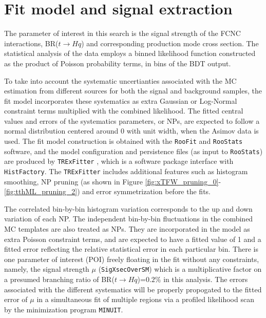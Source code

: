 \section{Fit model and signal extraction}
\label{sec:fit}

The parameter of interest in this search is the signal strength of the FCNC interactions, BR($t\to Hq$) and corresponding production mode cross section. The statistical analysis of the data employs a binned likelihood function constructed as the product of Poisson probability terms, in bins of the BDT output.

To take into account the systematic uncertianties associated with the MC estimation from different sources for both the signal and background samples, the fit model incorporates these systematics as extra Gaussian or Log-Normal constraint terms multiplied with the combined likelihood. The fitted central values and errors of the systematics parameters, or NPs, are expected to follow a normal distribution centered around 0 with unit width, when the Asimov data is used. The fit model construction is obtained with the \texttt{RooFit} and \texttt{RooStats} software, and the model configuration and persistence files (as input to \texttt{RooStats}) are produced by \texttt{TRExFitter} \cite{TRExFitter}, which is a software package interface with \texttt{HistFactory}. The \texttt{TRExFitter} includes additional features such as histogram smoothing, NP pruning (as shown in Figure \ref{fig:xTFW_pruning_0}-\ref{fig:tthML_pruning_2}) and error symmetrization before the fits.

The correlated bin-by-bin histogram variation corresponds to the up and down variation of each NP. The independent bin-by-bin fluctuations in the combined MC templates are also treated as NPs. They are incorporated in the model as extra Poisson constraint terms, and are expected to have a fitted value of 1 and a fitted error reflecting the relative statistical error in each particular bin. There is one parameter of interest (POI) freely floating in the fit without any constraints, namely, the signal strength $\mu$ (\texttt{SigXsecOverSM}) which is a multiplicative factor on a presumed branching ratio of BR($t\to Hq$)=$0.2\%$ in this analysis. The errors associated with the different systematics will be properly propogated to the fitted error of $\mu$ in a simultaneous fit of multiple regions via a profiled likelihood scan by the minimization program \texttt{MINUIT}. 

